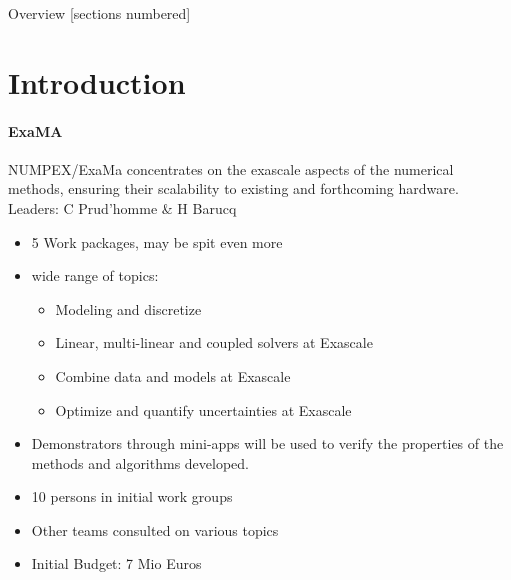 \titleframe

\begin{frame}{Overview}
  [sections numbered]
  \tableofcontents[hideallsubsections]
\end{frame}


\section{Introduction}
\begin{frame}{\insertsectionhead}
  \framesubtitle{ExaMA}
  NUMPEX/ExaMa concentrates on the exascale aspects of the numerical methods, ensuring their scalability to existing and forthcoming hardware.
  \vfill
  Leaders: C Prud'homme \& H Barucq
  \begin{itemize}
    \item 5 Work packages, may be spit even more
    \item wide range of topics: 
    \begin{itemize}
        \item Modeling and discretize
        \item  Linear, multi-linear and coupled solvers at Exascale
        \item Combine data and  models at Exascale
        \item Optimize and quantify uncertainties at Exascale
    \end{itemize}
    \item Demonstrators through mini-apps will be used to verify the properties of the methods and algorithms developed.
    
  \end{itemize}
\end{frame}
\begin{frame}{\insertsectionhead}
    
   \begin{itemize}
    \item 10 persons in initial work groups
    \item Other teams consulted on various topics 
    \item Initial Budget: 7 Mio Euros 
\end{itemize} 
\end{frame}
